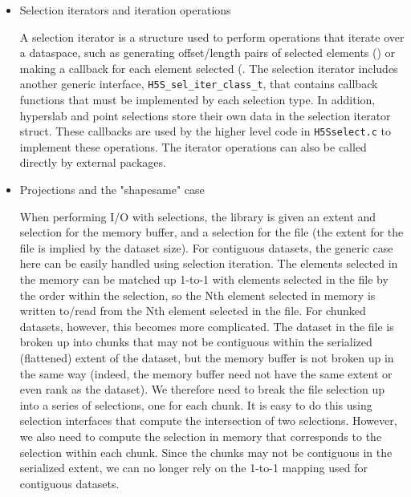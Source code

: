 \begin{itemize}
    \item Selection iterators and iteration operations

A selection iterator is a structure used to perform operations that iterate over a dataspace, such as generating offset/length pairs of selected elements () or making a callback for each element selected (. The selection iterator includes another generic interface, \texttt{H5S\_sel\_iter\_class\_t}, that contains callback functions that must be implemented by each selection type. In addition, hyperslab and point selections store their own data in the selection iterator struct. These callbacks are used by the higher level code in \texttt{H5Sselect.c} to implement these operations. The iterator operations can also be called directly by external packages.

    \item Projections and the "shapesame" case

When performing I/O with selections, the library is given an extent and selection for the memory buffer, and a selection for the file (the extent for the file is implied by the dataset size). For contiguous datasets, the generic case here can be easily handled using selection iteration. The elements selected in the memory can be matched up 1-to-1 with elements selected in the file by the order within the selection, so the Nth element selected in memory is written to/read from the Nth element selected in the file. For chunked datasets, however, this becomes more complicated. The dataset in the file is broken up into chunks that may not be contiguous within the serialized (flattened) extent of the dataset, but the memory buffer is not broken up in the same way (indeed, the memory buffer need not have the same extent or even rank as the dataset). We therefore need to break the file selection up into a series of selections, one for each chunk. It is easy to do this using selection interfaces that compute the intersection of two selections. However, we also need to compute the selection in memory that corresponds to the selection within each chunk. Since the chunks may not be contiguous in the serialized extent, we can no longer rely on the 1-to-1 mapping used for contiguous datasets.


\end{itemize}
